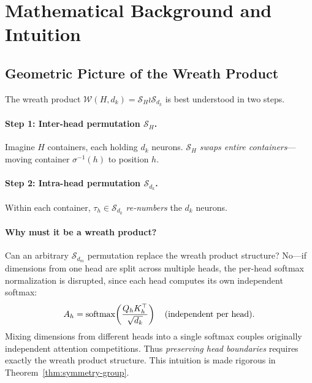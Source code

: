 \section{Mathematical Background and Intuition}
\label{sec:intuition}

\subsection{Geometric Picture of the Wreath Product}

The wreath product $\mathcal{W}(H, d_k) = \mathcal{S}_H \wr \mathcal{S}_{d_k}$ is best understood in two steps.

\paragraph{Step 1: Inter-head permutation $\mathcal{S}_H$.} Imagine $H$ containers, each holding $d_k$ neurons. $\mathcal{S}_H$ \emph{swaps entire containers}---moving container $\sigma^{-1}(h)$ to position $h$.

\paragraph{Step 2: Intra-head permutation $\mathcal{S}_{d_k}$.} Within each container, $\tau_h \in \mathcal{S}_{d_k}$ \emph{re-numbers} the $d_k$ neurons.

\paragraph{Why must it be a wreath product?} Can an arbitrary $\mathcal{S}_{d_m}$ permutation replace the wreath product structure? No---if dimensions from one head are split across multiple heads, the per-head softmax normalization is disrupted, since each head computes its own independent softmax:
\begin{equation}\label{eq:softmax-per-head}
    A_h = \operatorname{softmax}\!\left(\frac{Q_h K_h^\top}{\sqrt{d_k}}\right) \quad \text{(independent per head)}.
\end{equation}
Mixing dimensions from different heads into a single softmax couples originally independent attention competitions. Thus \emph{preserving head boundaries} requires exactly the wreath product structure. This intuition is made rigorous in Theorem~\ref{thm:symmetry-group}.

